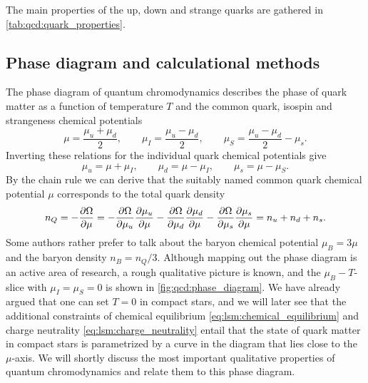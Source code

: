 The main properties of the up, down and strange quarks are gathered in \cref{tab:qcd:quark_properties}.

\subsection*{Phase diagram and calculational methods}

The phase diagram of quantum chromodynamics describes the phase of quark matter
as a function of temperature $T$ and the common quark, isospin and strangeness chemical potentials
\begin{equation}
	\mu   = \frac{\mu_u + \mu_d}{2}, \qquad
	\mu_I = \frac{\mu_u - \mu_d}{2}, \qquad
	\mu_S = \frac{\mu_u - \mu_d}{2} - \mu_s.
\label{eq:master_intro:chemical_potentials_transformed}
\end{equation}
Inverting these relations for the individual quark chemical potentials give
\begin{equation}
	\mu_u = \mu + \mu_I, \qquad
	\mu_d = \mu - \mu_I, \qquad
	\mu_s = \mu - \mu_S .
\label{eq:master_intro:chemical_potentials_particles}
\end{equation}
By the chain rule we can derive that the suitably named common quark chemical potential $\mu$ corresponds to the total quark density
\begin{equation}
	n_Q = -\pdv{\Omega}{\mu} =
	-\pdv{\Omega}{\mu_u} \pdv{\mu_u}{\mu}
	-\pdv{\Omega}{\mu_d} \pdv{\mu_d}{\mu}
	-\pdv{\Omega}{\mu_s} \pdv{\mu_s}{\mu} =
	n_u + n_d + n_s.
\end{equation}
Some authors rather prefer to talk about the baryon chemical potential $\mu_B = 3 \mu$ and the baryon density $n_B = n_Q / 3$.
Although mapping out the phase diagram is an active area of research, a rough qualitative picture is known, and the $\mu_B-T$-slice with $\mu_I = \mu_S = 0$ is shown in \cref{fig:qcd:phase_diagram}.
We have already argued that one can set $T=0$ in compact stars,
and we will later see that the additional constraints of chemical equilibrium \eqref{eq:lsm:chemical_equilibrium} and charge neutrality \eqref{eq:lsm:charge_neutrality} entail that
the state of quark matter in compact stars is parametrized by a curve in the diagram that lies close to the $\mu$-axis.
We will shortly discuss the most important qualitative properties of quantum chromodynamics and relate them to this phase diagram.

